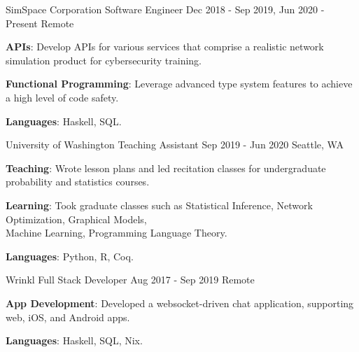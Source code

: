 

\begin{cventries}

  \cventry
    {SimSpace Corporation}
    {Software Engineer}
    {Dec 2018 - Sep 2019, Jun 2020 - Present}
    {Remote}
    {
      \begin{cvitems}
        \item {\color{graytext}\textbf{APIs}}: Develop APIs for various services that comprise a realistic
          network simulation product for cybersecurity training.
        \item {\color{graytext}\textbf{Functional Programming}}: Leverage
          advanced type system features to achieve a high level of
          code safety.
        \item {\color{graytext}\textbf{Languages}}: Haskell, SQL.
      \end{cvitems}
    }

  \cventry
    {University of Washington}
    {Teaching Assistant}
    {Sep 2019 - Jun 2020}
    {Seattle, WA}
    {
      \begin{cvitems}
      \item {\color{graytext}\textbf{Teaching}}: Wrote lesson plans and led recitation classes
        for undergraduate probability and statistics courses.
      \item {\color{graytext}\textbf{Learning}}: Took graduate classes such as Statistical Inference, Network
        Optimization, Graphical Models,\\ Machine Learning, Programming Language
        Theory.
        \item {\color{graytext}\textbf{Languages}}: Python, R, Coq.
      \end{cvitems}
    }


  \cventry
    {Wrinkl}
    {Full Stack Developer}
    {Aug 2017 - Sep 2019}
    {Remote}
    {
      \begin{cvitems}
        \item {\color{graytext}\textbf{App Development}}: Developed a websocket-driven chat application, supporting
          web, iOS, and Android apps.
        \item {\color{graytext}\textbf{Languages}}: Haskell, SQL, Nix.
      \end{cvitems}
    }


\end{cventries}
